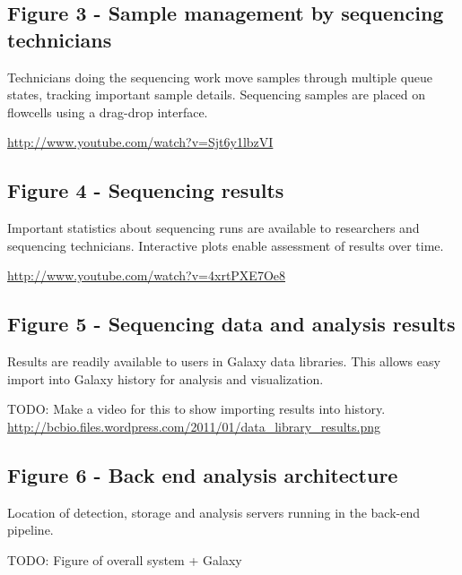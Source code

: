\documentclass[10pt]{bmc_article}
\newenvironment{bmcformat}{\begin{raggedright}\baselineskip20pt\sloppy\setboolean{publ}{false}}{\end{raggedright}\baselineskip20pt\sloppy}
\begin{document}
\begin{bmcformat}
\subsection*{Figure 3 - Sample management by sequencing technicians}
Technicians doing the sequencing work move samples through multiple
queue states, tracking important sample details. Sequencing samples
are placed on flowcells using a drag-drop interface.

\url{http://www.youtube.com/watch?v=Sjt6y1lbzVI}

\subsection*{Figure 4 - Sequencing results}
Important statistics about sequencing runs are available to
researchers and sequencing technicians. Interactive plots enable
assessment of results over time.

\url{http://www.youtube.com/watch?v=4xrtPXE7Oe8}

\subsection*{Figure 5 - Sequencing data and analysis results}
Results are readily available to users in Galaxy data libraries. This
allows easy import into Galaxy history for analysis and visualization.

TODO: Make a video for this to show importing results into
history.
\url{http://bcbio.files.wordpress.com/2011/01/data_library_results.png}

\subsection*{Figure 6 - Back end analysis architecture}
Location of detection, storage and analysis servers running in the
back-end pipeline.

TODO: Figure of overall system + Galaxy
\end{bmcformat}
\end{document}
